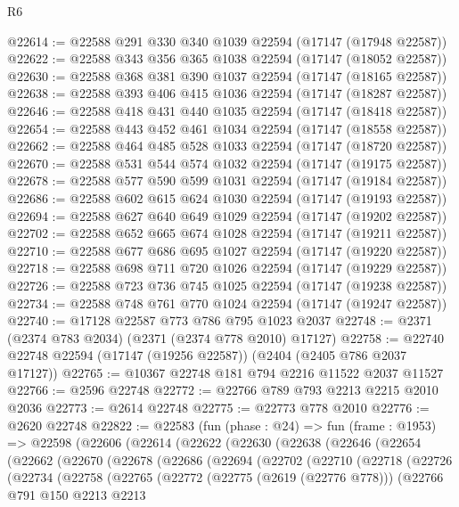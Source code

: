 \begin{lexlean}{R6}
\begin{coremodule}
@22614 := @22588 @291 @330 @340 @1039 @22594 (@17147 (@17948 @22587))
@22622 := @22588 @343 @356 @365 @1038 @22594 (@17147 (@18052 @22587))
@22630 := @22588 @368 @381 @390 @1037 @22594 (@17147 (@18165 @22587))
@22638 := @22588 @393 @406 @415 @1036 @22594 (@17147 (@18287 @22587))
@22646 := @22588 @418 @431 @440 @1035 @22594 (@17147 (@18418 @22587))
@22654 := @22588 @443 @452 @461 @1034 @22594 (@17147 (@18558 @22587))
@22662 := @22588 @464 @485 @528 @1033 @22594 (@17147 (@18720 @22587))
@22670 := @22588 @531 @544 @574 @1032 @22594 (@17147 (@19175 @22587))
@22678 := @22588 @577 @590 @599 @1031 @22594 (@17147 (@19184 @22587))
@22686 := @22588 @602 @615 @624 @1030 @22594 (@17147 (@19193 @22587))
@22694 := @22588 @627 @640 @649 @1029 @22594 (@17147 (@19202 @22587))
@22702 := @22588 @652 @665 @674 @1028 @22594 (@17147 (@19211 @22587))
@22710 := @22588 @677 @686 @695 @1027 @22594 (@17147 (@19220 @22587))
@22718 := @22588 @698 @711 @720 @1026 @22594 (@17147 (@19229 @22587))
@22726 := @22588 @723 @736 @745 @1025 @22594 (@17147 (@19238 @22587))
@22734 := @22588 @748 @761 @770 @1024 @22594 (@17147 (@19247 @22587))
@22740 := @17128 @22587 @773 @786 @795 @1023 @2037
@22748 := @2371 (@2374 @783 @2034) (@2371 (@2374 @778 @2010) @17127)
@22758 := @22740 @22748 @22594 (@17147 (@19256 @22587)) (@2404 (@2405 @786 @2037 @17127))
@22765 := @10367 @22748 @181 @794 @2216 @11522 @2037 @11527
@22766 := @2596 @22748
@22772 := @22766 @789 @793 @2213 @2215 @2010 @2036
@22773 := @2614 @22748
@22775 := @22773 @778 @2010
@22776 := @2620 @22748
@22822 := @22583
    (fun (phase : @24) =>
    fun (frame : @1953) =>
    @22598
      (@22606
        (@22614
          (@22622
            (@22630
              (@22638
                (@22646
                  (@22654
                    (@22662
                      (@22670
                        (@22678
                          (@22686
                            (@22694
                              (@22702
                                (@22710
                                  (@22718
                                    (@22726
                                      (@22734
                                        (@22758
                                          (@22765
                                            (@22772
                                              (@22775 (@2619 (@22776 @778)))
                                              (@22766
                                                @791
                                                @150
                                                @2213
                                                @2213

\end{coremodule}
\end{lexlean}
